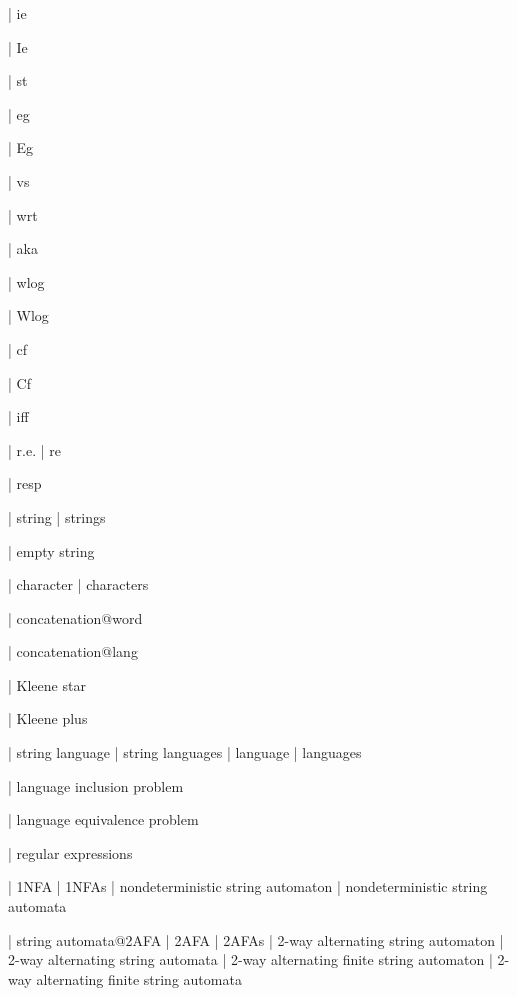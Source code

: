   | ie

  | Ie

  | st

  | eg

  | Eg

  | vs

  | wrt

  | aka

  | wlog

  | Wlog

  | cf

  | Cf

  | iff

  | r.e.
  | re

  | resp

%

%
%
%

| string
| strings

%
%

| empty string

| character
| characters

| concatenation@word

| concatenation@lang

| Kleene star

| Kleene plus

| string language
| string languages
| language
| languages

| language inclusion problem

| language equivalence problem

| regular expressions

| 1NFA
| 1NFAs
| nondeterministic string automaton
| nondeterministic string automata

| string automata@2AFA
| 2AFA
| 2AFAs
| 2-way alternating string automaton
| 2-way alternating string automata
| 2-way alternating finite string automaton
| 2-way alternating finite string automata

